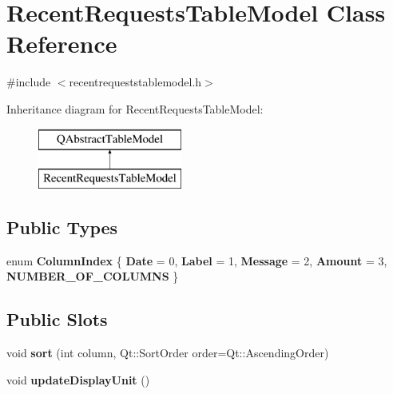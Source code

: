 \hypertarget{class_recent_requests_table_model}{}\section{Recent\+Requests\+Table\+Model Class Reference}
\label{class_recent_requests_table_model}


{\ttfamily \#include $<$recentrequeststablemodel.\+h$>$}

Inheritance diagram for Recent\+Requests\+Table\+Model\+:\begin{figure}[H]
\begin{center}
\leavevmode
\includegraphics[height=2.000000cm]{class_recent_requests_table_model}
\end{center}
\end{figure}
\subsection*{Public Types}
\begin{DoxyCompactItemize}
\item 
\mbox{\label{class_recent_requests_table_model_a720ff50ef9f8e016a5d2bbd8fd7fb41d}} 
enum {\bfseries Column\+Index} \{ \newline
{\bfseries Date} = 0, 
{\bfseries Label} = 1, 
{\bfseries Message} = 2, 
{\bfseries Amount} = 3, 
\newline
{\bfseries N\+U\+M\+B\+E\+R\+\_\+\+O\+F\+\_\+\+C\+O\+L\+U\+M\+NS}
 \}
\end{DoxyCompactItemize}
\subsection*{Public Slots}
\begin{DoxyCompactItemize}
\item 
\mbox{\label{class_recent_requests_table_model_a63ba78741b7115af25908f88d138c201}} 
void {\bfseries sort} (int column, Qt\+::\+Sort\+Order order=Qt\+::\+Ascending\+Order)
\item 
\mbox{\label{class_recent_requests_table_model_a8c4fe82f628df4e3a46809514ba9fe03}} 
void {\bfseries update\+Display\+Unit} ()
\end{DoxyCompactItemize}
